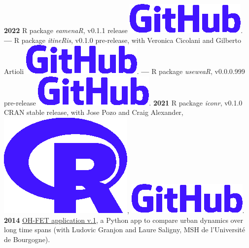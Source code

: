 \documentclass{article}
\begin{document}
\textbf{2022 }\textsf{R} package \textit{eamenaR}, v0.1.1 release \href{https://github.com/eamena-project/eamenaR/tree/main#readme}{\includegraphics[scale=0.1]{github-rect.png}}.
\smallbreak
\textbf{--- }\textsf{R} package \textit{itineRis}, v0.1.0 pre-release, with Veronica Cicolani and Gilberto Artioli \href{https://github.com/zoometh/itineRis/tree/main#readme}{\includegraphics[scale=0.1]{github-rect.png}}.
\textbf{--- }\textsf{R} package \textit{useweaR}, v0.0.0.999 pre-release \href{https://github.com/zoometh/itineRis/tree/main#readme}{\includegraphics[scale=0.1]{github-rect.png}}.
\smallbreak
\textbf{2021 }\textsf{R} package \textit{iconr}, v0.1.0 CRAN stable release, with Jose Pozo and Craig Alexander, \href{https://cran.r-project.org/web/packages/iconr/index.html}{\includegraphics[scale=0.04]{prog-r.png}}, \href{https://github.com/zoometh/iconr#readme}{\includegraphics[scale=0.1]{github-rect.png}}.
\smallbreak
\textbf{2014 }\href{https://www.oxbowbooks.com/dbbc/caa2014-21st-century-archaeology.html/}{OH-FET application v.1}, a \textsf{Python} app to compare urban dynamics over long time spans (with Ludovic Granjon and Laure Saligny, MSH de l'Universit\'{e} de Bourgogne).
\end{document}
